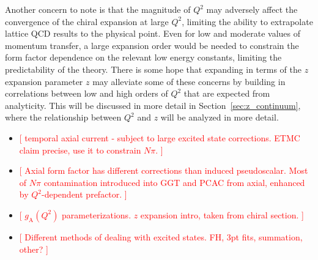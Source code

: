 Another concern to note is that the magnitude of $Q^2$ may adversely affect
 the convergence of the chiral expansion at large $Q^2$,
 limiting the ability to extrapolate lattice QCD results to the physical point.
Even for low and moderate values of momentum transfer,
 a large expansion order would be needed to constrain the form factor
 dependence on the relevant low energy constants,
 limiting the predictability of the theory.
There is some hope that expanding in terms of the $z$ expansion parameter $z$
 may alleviate some of these concerns by building in correlations between
 low and high orders of $Q^2$ that are expected from analyticity.
This will be discussed in more detail in Section~\ref{sec:z_continuum},
 where the relationship between $Q^2$ and $z$ will be analyzed in more detail.

\begin{itemize}
\item
\textcolor{red}{[
 temporal axial current - subject to large excited state corrections.
 ETMC claim precise, use it to constrain $N\pi$.
]}
\item
\textcolor{red}{[
 Axial form factor has different corrections than induced pseudoscalar.
 Most of $N\pi$ contamination introduced into GGT and PCAC from axial,
 enhanced by $Q^2$-dependent prefactor.
]}
\item
\textcolor{red}{[
 $g_{\mathrm{A}}(Q^2)$ parameterizations.
 $z$ expansion intro, taken from chiral section.
]}
\item
\textcolor{red}{[
 Different methods of dealing with excited states.
 FH, 3pt fits, summation, other?
]}
\end{itemize}

